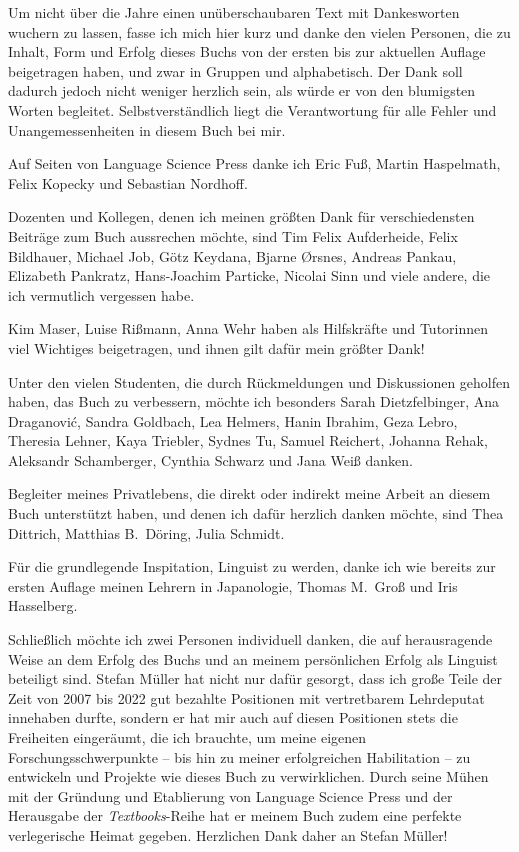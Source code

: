 \addchap{\lsAcknowledgementTitle} 

Um nicht über die Jahre einen unüberschaubaren Text mit Dankesworten wuchern zu lassen, fasse ich mich hier kurz und danke den vielen Personen, die zu Inhalt, Form und Erfolg dieses Buchs von der ersten bis zur aktuellen Auflage beigetragen haben, und zwar in Gruppen und alphabetisch.
Der Dank soll dadurch jedoch nicht weniger herzlich sein, als würde er von den blumigsten Worten begleitet.
Selbstverständlich liegt die Verantwortung für alle Fehler und Unangemessenheiten in diesem Buch bei mir.

Auf Seiten von Language Science Press danke ich Eric Fuß, Martin Haspelmath, Felix Kopecky und Sebastian Nordhoff.

Dozenten und Kollegen, denen ich meinen größten Dank für verschiedensten Beiträge zum Buch aussrechen möchte, sind Tim Felix Aufderheide, Felix Bildhauer, Michael Job, Götz Keydana, Bjarne Ørsnes, Andreas Pankau, Elizabeth Pankratz, Hans-Joachim Particke, Nicolai Sinn und viele andere, die ich vermutlich vergessen habe.

Kim Maser, Luise Rißmann, Anna Wehr haben als Hilfskräfte und Tutorinnen viel Wichtiges beigetragen, und ihnen gilt dafür mein größter Dank!

Unter den vielen Studenten, die durch Rückmeldungen und Diskussionen geholfen haben, das Buch zu verbessern, möchte ich besonders Sarah Dietzfelbinger, Ana Draganovi\'{c}, Sandra Goldbach, Lea Helmers, Hanin Ibrahim, Geza Lebro, Theresia Lehner, Kaya Triebler, Sydnes Tu, Samuel Reichert, Johanna Rehak, Aleksandr Schamberger, Cynthia Schwarz und Jana Weiß danken.

Begleiter meines Privatlebens, die direkt oder indirekt meine Arbeit an diesem Buch unterstützt haben, und denen ich dafür herzlich danken möchte, sind Thea Dittrich, Matthias B.\ Döring, Julia Schmidt.

Für die grundlegende Inspitation, Linguist zu werden, danke ich wie bereits zur ersten Auflage meinen Lehrern in Japanologie, Thomas M.\ Groß und Iris Hasselberg.

Schließlich möchte ich zwei Personen individuell danken, die auf herausragende Weise an dem Erfolg des Buchs und an meinem persönlichen Erfolg als Linguist beteiligt sind. Stefan Müller hat nicht nur dafür gesorgt, dass ich große Teile der Zeit von 2007 bis 2022 gut bezahlte Positionen mit vertretbarem Lehrdeputat innehaben durfte, sondern er hat mir auch auf diesen Positionen stets die Freiheiten eingeräumt, die ich brauchte, um meine eigenen Forschungsschwerpunkte -- bis hin zu meiner erfolgreichen Habilitation -- zu entwickeln und Projekte wie dieses Buch zu verwirklichen. Durch seine Mühen mit der Gründung und Etablierung von Language Science Press und der Herausgabe der \textit{Textbooks}-Reihe hat er meinem Buch zudem eine perfekte verlegerische Heimat gegeben. Herzlichen Dank daher an Stefan Müller!


